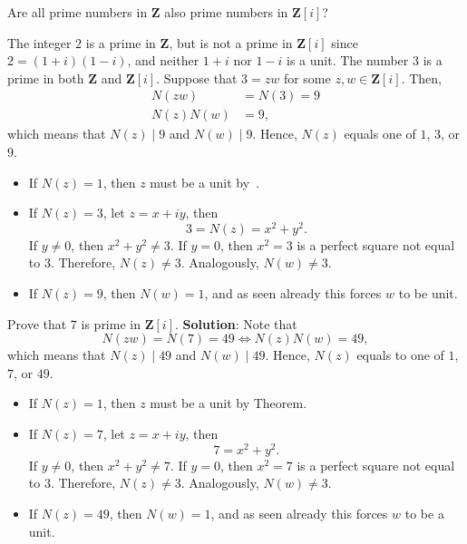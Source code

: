 \begin{Exercise}{}{}
    Are all prime numbers in $ \mathbf{Z} $ also prime numbers in $ \mathbf{Z}[i] $?
\end{Exercise}
\begin{Example}{}{}
    The integer $ 2 $ is a prime in $ \mathbf{Z} $, but is not a prime in $ \mathbf{Z}[i] $ since
    $ 2=(1+i)(1-i) $, and neither $ 1+i $ nor $ 1-i $ is a unit. The number $ 3 $ is a prime
    in both $ \mathbf{Z} $ and $ \mathbf{Z}[i] $. Suppose that $ 3=zw $ for some $ z,w\in\mathbf{Z}[i] $.
    Then,
    \begin{align*}
        N(zw)    & =N(3)=9 \\
        N(z)N(w) & =9,
    \end{align*}
    which means that $ N(z)\mid 9 $ and $ N(w)\mid 9 $. Hence, $ N(z) $ equals one of $ 1 $, $ 3 $, or $ 9 $.
    \begin{itemize}
        \item If $ N(z)=1 $, then $ z $ must be a unit by~.
        \item If $ N(z)=3 $, let $ z=x+iy $, then
              \[ 3=N(z)=x^2+y^2. \]
              If $ y\ne 0 $, then $ x^2+y^2\ne 3 $. If $ y=0 $, then $ x^2=3 $
              is a perfect square not equal to $ 3 $. Therefore, $ N(z)\ne 3 $. Analogously, $ N(w)\ne 3 $.
        \item If $ N(z)=9 $, then $ N(w)=1 $, and as seen already this forces $w$ to be unit.
    \end{itemize}
\end{Example}
\begin{Exercise}{}{}
    Prove that $ 7 $ is prime in $ \mathbf{Z}[i] $.
    \tcblower{}
    \textbf{Solution}:
    Note that
    \[ N(zw)=N(7)=49\iff N(z)N(w)=49, \]
    which means that $ N(z)\mid 49 $ and $ N(w)\mid 49 $. Hence, $ N(z) $ equals to one of $ 1 $, $ 7 $, or $ 49 $.
    \begin{itemize}
        \item If $ N(z)=1 $, then $ z $ must be a unit by Theorem.
        \item If $ N(z)=7 $, let $ z=x+iy $, then
              \[ 7=x^2+y^2. \]
              If $ y\ne 0 $, then $ x^2+y^2\ne 7 $. If $ y=0 $, then $ x^2=7 $
              is a perfect square not equal to $ 3 $. Therefore, $ N(z)\ne 3 $. Analogously, $ N(w)\ne 3 $.
        \item If $ N(z)=49 $, then $ N(w)=1 $, and as seen already this forces $ w $ to be a unit.
    \end{itemize}
\end{Exercise}
